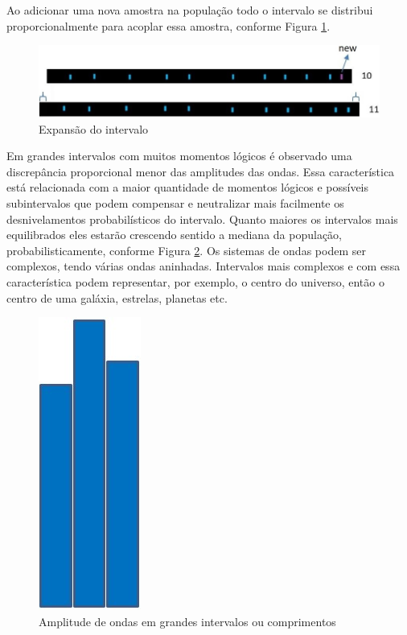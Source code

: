 Ao adicionar uma nova amostra na população todo o intervalo se distribui proporcionalmente para acoplar essa amostra, conforme Figura \ref{fig:consciousness_space_volume_amplitude}.
	\begin{figure}[H]
	\caption{Expansão do intervalo}
	\label{fig:consciousness_space_volume_amplitude}
	\centering
	\includegraphics[scale=.5]{sections/images/consciousness_space_volume_amplitude.jpg}
	\end{figure}

Em grandes intervalos com muitos momentos lógicos é observado uma discrepância proporcional menor das amplitudes das ondas. Essa característica está relacionada com a maior quantidade de momentos lógicos e possíveis subintervalos que podem compensar e neutralizar mais facilmente os desnivelamentos probabilísticos do intervalo. Quanto maiores os intervalos mais equilibrados eles estarão crescendo sentido a mediana da população, probabilisticamente, conforme Figura \ref{fig:consciousness_space_subconsciousness}. Os sistemas de ondas podem ser complexos, tendo várias ondas aninhadas. Intervalos mais complexos e com essa característica podem representar, por exemplo, o centro do universo, então o centro de uma galáxia, estrelas, planetas etc.
	\begin{figure}[H]
	\caption{Amplitude de ondas em grandes intervalos ou comprimentos}
	\label{fig:consciousness_space_subconsciousness}
	\centering
	\includegraphics[scale=.45]{sections/images/consciousness_space_subconsciousness.jpg}
	\end{figure}

